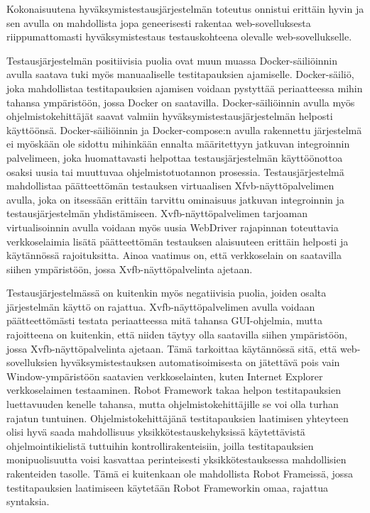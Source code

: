   Kokonaisuutena hyväksymistestausjärjestelmän toteutus onnistui erittäin hyvin ja sen avulla on mahdollista jopa geneerisesti rakentaa web-sovelluksesta riippumattomasti hyväksymistestaus testauskohteena olevalle web-sovellukselle.

  Testausjärjestelmän positiivisia puolia ovat muun muassa Docker-säiliöinnin avulla saatava tuki myös manuaaliselle testitapauksien ajamiselle.
  Docker-säiliö, joka mahdollistaa testitapauksien ajamisen voidaan pystyttää periaatteessa mihin tahansa ympäristöön, jossa Docker on saatavilla.
  Docker-säiliöinnin avulla myös ohjelmistokehittäjät saavat valmiin hyväksymistestausjärjestelmän helposti käyttöönsä.
  Docker-säiliöinnin ja Docker-compose:n avulla rakennettu järjestelmä ei myöskään ole sidottu mihinkään ennalta määritettyyn jatkuvan integroinnin palvelimeen, joka huomattavasti helpottaa testausjärjestelmän käyttöönottoa osaksi uusia tai muuttuvaa ohjelmistotuotannon prosessia.
  Testausjärjestelmä mahdollistaa päätteettömän testauksen virtuaalisen Xfvb-näyttöpalvelimen avulla, joka on itsessään erittäin tarvittu ominaisuus jatkuvan integroinnin ja testausjärjestelmän yhdistämiseen.
  Xvfb-näyttöpalvelimen tarjoaman virtualisoinnin avulla voidaan myös uusia WebDriver rajapinnan toteuttavia verkkoselaimia lisätä päätteettömän testauksen alaisuuteen erittäin helposti ja käytännössä rajoituksitta.
  Ainoa vaatimus on, että verkkoselain on saatavilla siihen ympäristöön, jossa Xvfb-näyttöpalvelinta ajetaan.

  Testausjärjestelmässä on kuitenkin myös negatiivisia puolia, joiden osalta järjestelmän käyttö on rajattua.
  Xvfb-näyttöpalvelimen avulla voidaan päätteettömästi testata periaatteessa mitä tahansa GUI-ohjelmia, mutta rajoitteena on kuitenkin, että niiden täytyy olla saatavilla siihen ympäristöön, jossa Xvfb-näyttöpalvelinta ajetaan.
  Tämä tarkoittaa käytännössä sitä, että web-sovelluksien hyväksymistestauksen automatisoimisesta on jätettävä pois vain Window-ympäristöön saatavien verkkoselainten, kuten Internet Explorer verkkoselaimen testaaminen.
  Robot Framework takaa helpon testitapauksien luettavuuden kenelle tahansa, mutta ohjelmistokehittäjille se voi olla turhan rajatun tuntuinen.
  Ohjelmistokehittäjänä testitapauksien laatimisen yhteyteen olisi hyvä saada mahdollisuus yksikkötestauskehyksissä käytettävistä ohjelmointikielistä tuttuihin kontrollirakenteisiin, joilla testitapauksien monipuolisuutta voisi kasvattaa perinteisesti yksikkötestauksessa mahdollisien rakenteiden tasolle.
  Tämä ei kuitenkaan ole mahdollista Robot Frameissä, jossa testitapauksien laatimiseen käytetään Robot Frameworkin omaa, rajattua syntaksia.

